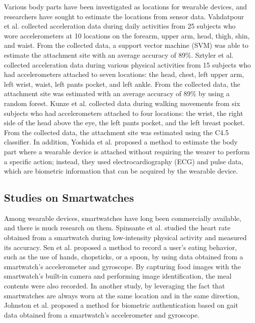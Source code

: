 \documentclass[manuscript,screen,review]{acmart}
\begin{document}
Various body parts have been investigated as locations for wearable devices, and researchers have sought to estimate the locations from sensor data. Vahdatpour et al. \cite{localization_vahdatpour} collected acceleration data during daily activities from 25 subjects who wore accelerometers at 10 locations on the forearm, upper arm, head, thigh, shin, and waist. From the collected data, a support vector machine (SVM) was able to estimate the attachment site with an average accuracy of 89\%. Sztyler et al. \cite{localization_sztyler} collected acceleration data during various physical activities from 15 subjects who had accelerometers attached to seven locations: the head, chest, left upper arm, left wrist, waist, left pants pocket, and left ankle. From the collected data, the attachment site was estimated with an average accuracy of 89\% by using a random forest. Kunze et al. \cite{localization_kunze} collected data during walking movements from six subjects who had accelerometers attached to four locations: the wrist, the right side of the head above the eye, the left pants pocket, and the left breast pocket. From the collected data, the attachment site was estimated using the C4.5 classifier. In addition, Yoshida et al. \cite{localization_yoshida} proposed a method to estimate the body part where a wearable device is attached without requiring the wearer to perform a specific action; instead, they used electrocardiography (ECG) and pulse data, which are biometric information that can be acquired by the wearable device.


\subsection{Studies on Smartwatches}
Among wearable devices, smartwatches have long been commercially available, and there is much research on them. Spinsante et al. \cite{accuracy_in_low_intensity} studied the heart rate obtained from a smartwatch during low-intensity physical activity and measured its accuracy. Sen et al. \cite{eating_recognition} proposed a method to record a user's eating behavior, such as the use of hands, chopsticks, or a spoon, by using data obtained from a smartwatch's accelerometer and gyroscope. By capturing food images with the smartwatch's built-in camera and performing image identification, the meal contents were also recorded. In another study, by leveraging the fact that smartwatches are always worn at the same location and in the same direction, Johnston et al. \cite{smartwatch_walk_authentication} proposed a method for biometric authentication based on gait data obtained from a smartwatch's accelerometer and gyroscope.\par
\end{document}

